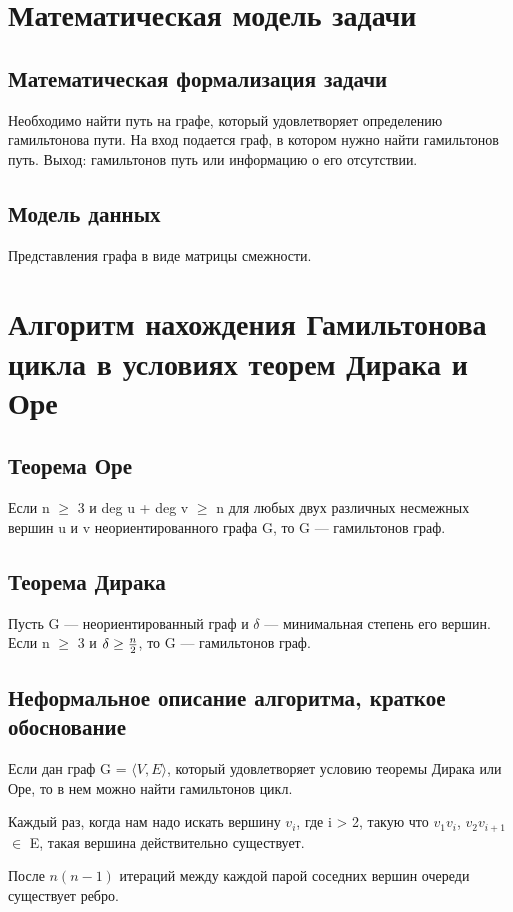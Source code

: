 \section{Математическая модель задачи}

\subsection{Математическая формализация задачи}
Необходимо найти путь на графе, который удовлетворяет определению гамильтонова пути.
На вход подается граф, в котором нужно найти гамильтонов путь.
Выход: гамильтонов путь или информацию о его отсутствии.

\subsection{Модель данных}
Представления графа в виде матрицы смежности.


\section{Алгоритм нахождения Гамильтонова цикла в условиях теорем Дирака и Оре}

\subsection{Теорема Оре}
Если n $\geq$ 3 и deg u + deg v $\geq$ n для любых двух различных несмежных вершин u и v неориентированного графа  G, то  G — гамильтонов граф.

\subsection{Теорема Дирака}
Пусть G — неориентированный граф и $\delta$ — минимальная степень его вершин.
Если n $\geq$ 3 и $\delta\geq{n\over{2}}$, то  G — гамильтонов граф.

\subsection{Неформальное описание алгоритма, краткое обоснование}
Если дан граф G = $\langle {V, E} \rangle$, который удовлетворяет условию теоремы Дирака или Оре,
то в нем можно найти гамильтонов цикл.

Каждый раз, когда нам надо искать вершину $v_i$, где i > 2, такую что $v_{1}v_{i}$, $v_{2}v_{i+1}$ $\in$ E, такая вершина действительно существует.

После $n(n - 1)$ итераций между каждой парой соседних вершин очереди существует ребро.

